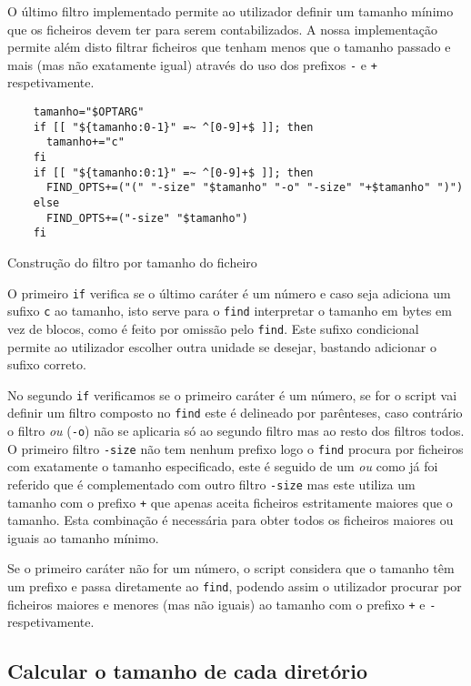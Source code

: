 O último filtro implementado permite ao utilizador definir um tamanho mínimo que
os ficheiros devem ter para serem contabilizados. A nossa implementação permite
além disto filtrar ficheiros que tenham menos que o tamanho passado e mais (mas
não exatamente igual) através do uso dos prefixos \Verb|-| e \Verb|+|
respetivamente.

\begin{listing}[H]
	\centering
	\begin{verbatim}
    tamanho="$OPTARG"
    if [[ "${tamanho:0-1}" =~ ^[0-9]+$ ]]; then
      tamanho+="c"
    fi
    if [[ "${tamanho:0:1}" =~ ^[0-9]+$ ]]; then
      FIND_OPTS+=("(" "-size" "$tamanho" "-o" "-size" "+$tamanho" ")")
    else
      FIND_OPTS+=("-size" "$tamanho")
    fi
  \end{verbatim}
	\caption{Construção do filtro por tamanho do ficheiro}
\end{listing}

O primeiro \Verb|if| verifica se o último caráter é um número e caso seja
adiciona um sufixo \Verb|c| ao tamanho, isto serve para o \Verb|find|
interpretar o tamanho em bytes em vez de blocos, como é feito por omissão pelo
\Verb|find|. Este sufixo condicional permite ao utilizador escolher outra
unidade se desejar, bastando adicionar o sufixo correto.

No segundo \Verb|if| verificamos se o primeiro caráter é um número, se for o
script vai definir um filtro composto no \Verb|find| este é delineado por
parênteses, caso contrário o filtro \emph{ou} (\Verb|-o|) não se aplicaria só ao
segundo filtro mas ao resto dos filtros todos. O primeiro filtro \Verb|-size|
não tem nenhum prefixo logo o \Verb|find| procura por ficheiros com exatamente o
tamanho especificado, este é seguido de um \emph{ou} como já foi referido que é
complementado com outro filtro \Verb|-size| mas este utiliza um tamanho com o
prefixo \Verb|+| que apenas aceita ficheiros estritamente maiores que o tamanho.
Esta combinação é necessária para obter todos os ficheiros maiores ou iguais ao
tamanho mínimo.

Se o primeiro caráter não for um número, o script considera que o tamanho têm um
prefixo e passa diretamente ao \Verb|find|, podendo assim o utilizador procurar
por ficheiros maiores e menores (mas não iguais) ao tamanho com o prefixo
\Verb|+| e \Verb|-| respetivamente.

\subsection{Calcular o tamanho de cada diretório}
\label{sec:implementation_calculate_size}

